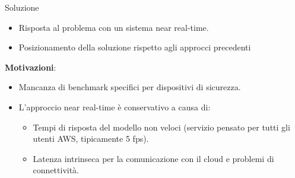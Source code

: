 \documentclass{beamer}
\begin{document}


\begin{frame}{Soluzione}

\begin{itemize}
    \item Risposta al problema con un sistema near real-time.
    \item Posizionamento della soluzione rispetto agli approcci precedenti
\end{itemize}

\textbf{Motivazioni}:
\begin{itemize}
    \item Mancanza di benchmark specifici per dispositivi di sicurezza.
    \item L'approccio near real-time è conservativo a causa di:
    \begin{itemize}
        \item Tempi di risposta del modello non veloci (servizio pensato per tutti gli utenti AWS, tipicamente 5 fps).
        \item Latenza intrinseca per la comunicazione con il cloud e problemi di connettività.
    \end{itemize}
\end{itemize}
\end{frame}
\end{document}
